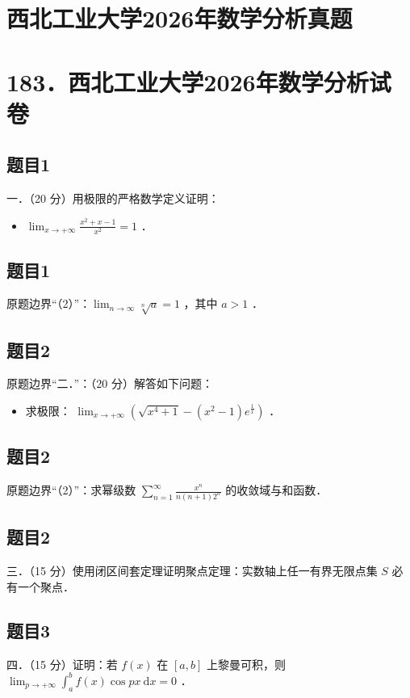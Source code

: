 \documentclass{article}
\begin{document}
\section*{西北工业大学2026年数学分析真题}
\section*{183．西北工业大学2026年数学分析试卷}

\subsection{题目1}
一．（20 分）用极限的严格数学定义证明：

\begin{itemize}
  \item[（1）] \(\lim _{x \rightarrow+\infty} \frac{x^{2}+x-1}{x^{2}}=1\) ．
\end{itemize}

\subsection{题目1}
原题边界“（2）”：\(\lim _{n \rightarrow \infty} \sqrt[n]{a}=1\) ，其中 \(a>1\) ．

\subsection{题目2}
原题边界“二．”：（20 分）解答如下问题：

\begin{itemize}
\item[（1）] 求极限： \(\lim _{x \rightarrow+\infty}\left(\sqrt{x^{4}+1}-\left(x^{2}-1\right) e^{\frac{1}{x}}\right)\) ．
\end{itemize}

\subsection{题目2}
原题边界“（2）”：求幂级数 \(\sum_{n=1}^{\infty} \frac{x^{n}}{n(n+1) 2^{n}}\) 的收敛域与和函数．

\subsection{题目2}
三．（15 分）使用闭区间套定理证明聚点定理：实数轴上任一有界无限点集 \(S\) 必有一个聚点．

\subsection{题目3}
四．（15 分）证明：若 \(f(x)\) 在 \([a, b]\) 上黎曼可积，则 \(\lim _{p \rightarrow+\infty} \int_{a}^{b} f(x) \cos p x \mathrm{~d} x=0\) ．
\end{document}
